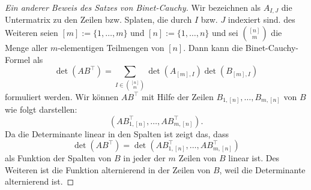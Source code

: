\begin{proof}[Ein anderer Beweis des Satzes von Binet-Cauchy]
	Wir bezeichnen als $A_{I,J}$ die Untermatrix zu den Zeilen bzw. Splaten, die durch $I$ bzw. $J$ indexiert sind. des Weiteren seien $[m] := \{1,\ldots,m\}$ und $[n] := \{1,\ldots, n\}$ und sei $\binom{[n]}{m}$ die Menge aller $m$-elementigen Teilmengen von $[n]$. Dann kann die Binet-Cauchy-Formel als 
	\[
		\det(A B^\top) = \sum_{I \in \binom{[n]}{m}} \det(A_{[m], I }) \det(B_{[m], I}) 
	\]
	formuliert werden. Wir können $A B^\top$ mit Hilfe der Zeilen $B_{1,[n]},\ldots, B_{m,[n]}$ von $B$ wie folgt darstellen: 
	\[
		 ( A B_{1,[n]}^\top,\ldots, A B_{m,[n]}^\top) . 
	\]
	Da die Determinante linear in den Spalten ist zeigt das, dass 
	\[
		\det(A B^\top) = \det( A B_{1,[n]}^\top,\ldots, A B_{m,[n]}^\top) 
	\]
	als Funktion der Spalten von $B$ in jeder der $m$ Zeilen von $B$ linear  ist. Des Weiteren ist die Funktion alternierend in der Zeilen von $B$, weil die Determinante alternierend ist. 
	

\end{proof}
